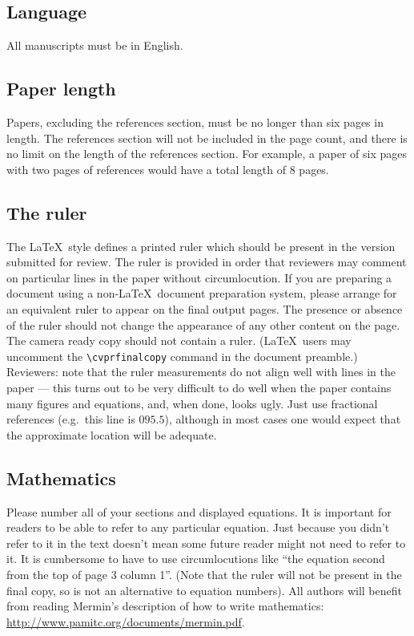 \documentclass[10pt,twocolumn,letterpaper]{article}
\begin{document}
\subsection{Language}

All manuscripts must be in English.


\subsection{Paper length}
Papers, excluding the references section,
must be no longer than six pages in length. The references section
will not be included in the page count, and there is no limit on the
length of the references section. For example, a paper of six pages
with two pages of references would have a total length of 8 pages.

\subsection{The ruler}
The \LaTeX\ style defines a printed ruler which should be present in the
version submitted for review.  The ruler is provided in order that
reviewers may comment on particular lines in the paper without
circumlocution.  If you are preparing a document using a non-\LaTeX\
document preparation system, please arrange for an equivalent ruler to
appear on the final output pages.  The presence or absence of the ruler
should not change the appearance of any other content on the page.  The
camera ready copy should not contain a ruler. (\LaTeX\ users may uncomment
the \verb'\cvprfinalcopy' command in the document preamble.)  Reviewers:
note that the ruler measurements do not align well with lines in the paper
--- this turns out to be very difficult to do well when the paper contains
many figures and equations, and, when done, looks ugly.  Just use fractional
references (e.g.\ this line is $095.5$), although in most cases one would
expect that the approximate location will be adequate.

\subsection{Mathematics}

Please number all of your sections and displayed equations.  It is
important for readers to be able to refer to any particular equation.  Just
because you didn't refer to it in the text doesn't mean some future reader
might not need to refer to it.  It is cumbersome to have to use
circumlocutions like ``the equation second from the top of page 3 column
1''.  (Note that the ruler will not be present in the final copy, so is not
an alternative to equation numbers).  All authors will benefit from reading
Mermin's description of how to write mathematics:
\url{http://www.pamitc.org/documents/mermin.pdf}.
\end{document}

